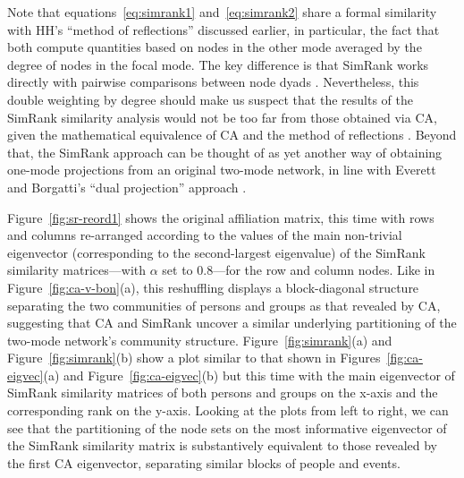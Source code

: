 \documentclass[a4paper,fleqn]{cas-sc}
\begin{document}
Note that equations~\ref{eq:simrank1} and~\ref{eq:simrank2} share a formal similarity with HH's ``method of reflections'' discussed earlier, in particular, the fact that both compute quantities based on nodes in the other mode averaged by the degree of nodes in the focal mode. The key difference is that SimRank works directly with pairwise comparisons between node dyads \citep{jeh2002simrank}. Nevertheless, this double weighting by degree should make us suspect that the results of the SimRank similarity analysis would not be too far from those obtained via CA, given the mathematical equivalence of CA and the method of reflections \citep{mealy2019interpreting, van2021correspondence}. Beyond that, the SimRank approach can be thought of as yet another way of obtaining one-mode projections from an original two-mode network, in line with Everett and Borgatti's ``dual projection'' approach \citep{everett2013dual}.

Figure~\ref{fig:sr-reord1} shows the original affiliation matrix, this time with rows and columns re-arranged according to the values of the main non-trivial eigenvector (corresponding to the second-largest eigenvalue) of the SimRank similarity matrices---with $\alpha$ set to $0.8$---for the row and column nodes. Like in Figure~\ref{fig:ca-v-bon}(a), this reshuffling displays a block-diagonal structure separating the two communities of persons and groups as that revealed by CA, suggesting that CA and SimRank uncover a similar underlying partitioning of the two-mode network's community structure. Figure~\ref{fig:simrank}(a) and Figure~\ref{fig:simrank}(b) show a plot similar to that shown in Figures~\ref{fig:ca-eigvec}(a) and Figure~\ref{fig:ca-eigvec}(b) but this time with the main eigenvector of SimRank similarity matrices of both persons and groups on the x-axis and the corresponding rank on the y-axis. Looking at the plots from left to right, we can see that the partitioning of the node sets on the most informative eigenvector of the SimRank similarity matrix is substantively equivalent to those revealed by the first CA eigenvector, separating similar blocks of people and events.  
\end{document}
